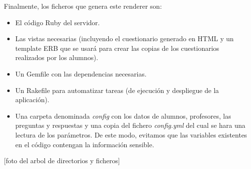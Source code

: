 Finalmente, los ficheros que genera este renderer son:
\begin{itemize}
  \item El c\'odigo Ruby del servidor.
  \item Las vistas necesarias (incluyendo el cuestionario generado en HTML y un template ERB que se usar\'a para crear las copias de los cuestionarios
  realizados por los alumnos).
  \item Un Gemfile con las dependencias necesarias.
  \item Un Rakefile para automatizar tareas (de ejecuci\'on y despliegue de la aplicaci\'on).
  \item Una carpeta denominada \textit{config} con los datos de alumnos, profesores, las preguntas y respuestas y una copia del fichero \textit{config.yml}
  del cual se hara una lectura de los par\'ametros. De este modo, evitamos que las variables existentes en el c\'odigo contengan la informaci\'on sensible.
\end{itemize}

[foto del arbol de directorios y ficheros]




% 
% 
% 
% 
% 
% 
% 
